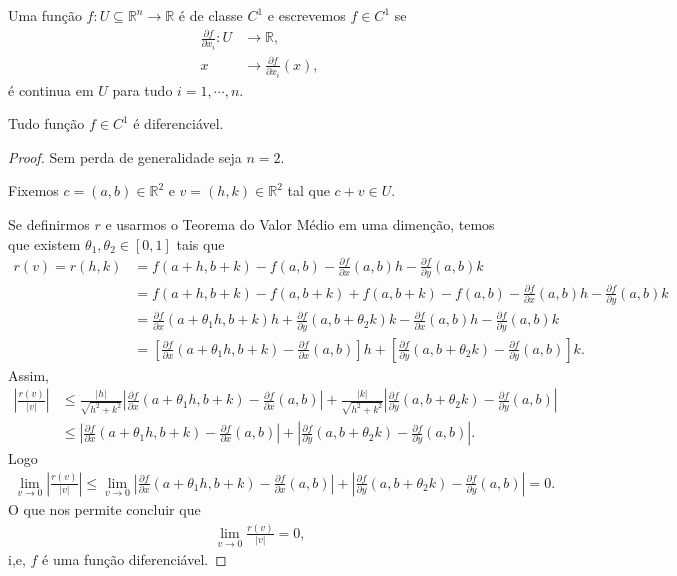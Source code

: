 \begin{definition}[Funções $C^{1}$]
  Uma função $f:U\subseteq\mathbb{R}^{n}\to\mathbb{R}$ é de classe $C^{1}$ e escrevemos $f\in C^{1}$ se 
  \begin{align*}
    \frac{\partial f}{\partial x_i}:U&\to\mathbb{R},\\
    x&\to\frac{\partial f}{\partial x_i}(x),
  \end{align*}
  é continua em $U$ para tudo $i=1,\cdots,n$. 
\end{definition}
\begin{theorem}
  Tudo função $f\in C^{1}$ é diferenciável. 
\end{theorem}
\begin{proof} 
  Sem perda de generalidade seja $n=2$.

  Fixemos $c=(a,b)\in\mathbb{R}^{2}$ e $v=(h,k)\in\mathbb{R}^{2}$ tal que $c+v\in U$.

  Se definirmos $r$ e usarmos o Teorema do Valor Médio em uma dimenção, temos que existem $\theta_1,\theta_2\in[0,1]$ tais que 
  \begin{align*}
    r(v)=r(h,k)&=f(a+h,b+k)-f(a,b)-\frac{\partial f}{\partial x}(a,b)h-\frac{\partial f}{\partial y}(a,b)k\\
    &=f(a+h,b+k)-f(a,b+k)+f(a,b+k)-f(a,b)-\frac{\partial f}{\partial x}(a,b)h-\frac{\partial f}{\partial y}(a,b)k\\
    &=\frac{\partial f}{\partial x}(a+\theta_1h,b+k)h+\frac{\partial f}{\partial y}(a,b+\theta_2k)k-\frac{\partial f}{\partial x}(a,b)h-\frac{\partial f}{\partial y}(a,b)k\\
    &=\left[ \frac{\partial f}{\partial x}(a+\theta_1h,b+k)-\frac{\partial f}{\partial x}(a,b) \right]h+\left[ \frac{\partial f}{\partial y}(a,b+\theta_2k)-\frac{\partial f}{\partial y}(a,b) \right]k.
  \end{align*}
  Assim,
  \begin{align*}
    \left|\frac{r(v)}{|v|}\right|&\leq\frac{|h|}{\sqrt{h^2+k^2}}\left| \frac{\partial f}{\partial x}(a+\theta_1h,b+k)-\frac{\partial f}{\partial x}(a,b) \right|+\frac{|k|}{\sqrt{h^2+k^2}}\left| \frac{\partial f}{\partial y}(a,b+\theta_2k)-\frac{\partial f}{\partial y}(a,b) \right|\\
    &\leq\left| \frac{\partial f}{\partial x}(a+\theta_1h,b+k)-\frac{\partial f}{\partial x}(a,b) \right|+\left| \frac{\partial f}{\partial y}(a,b+\theta_2k)-\frac{\partial f}{\partial y}(a,b) \right|.
  \end{align*}
  Logo
  \begin{align*}
    \lim_{v \to 0}\left| \frac{r(v)}{|v|} \right|\leq \lim_{v \to 0}\left| \frac{\partial f}{\partial x}(a+\theta_1h,b+k)-\frac{\partial f}{\partial x}(a,b) \right|+\left| \frac{\partial f}{\partial y}(a,b+\theta_2k)-\frac{\partial f}{\partial y}(a,b) \right|=0.
  \end{align*}
  O que nos permite concluir que
  \begin{align*}
    \lim_{v \to 0}\frac{r(v)}{|v|}=0,
  \end{align*}
  i,e, $f$ é uma função diferenciável. 
\end{proof}
